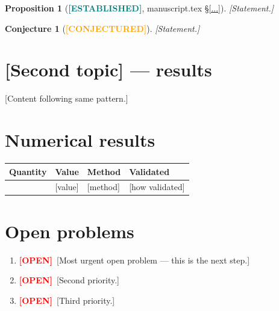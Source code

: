 \documentclass[11pt, a4paper]{article}
\newcommand{\established}{\textcolor{teal}{\textbf{[ESTABLISHED]}}}
\newcommand{\conjectured}{\textcolor{orange}{\textbf{[CONJECTURED]}}}
\newcommand{\open}{\textcolor{red}{\textbf{[OPEN]}}}
\theoremstyle{plain}
\newtheorem{proposition}[theorem]{Proposition}
\newtheorem{conjecture}[theorem]{Conjecture}
\theoremstyle{definition}
\begin{document}
\begin{proposition}[\established, manuscript.tex \S\ref{...}]
[Statement.]
\end{proposition}

\begin{conjecture}[\conjectured]
[Statement.]
\end{conjecture}

\section{[Second topic] — results}
\label{sec:topic2results}

[Content following same pattern.]

\section{Numerical results}
\label{sec:numericresults}


\begin{center}
\begin{tabular}{llll}
\toprule
Quantity & Value & Method & Validated \\
\midrule
[quantity] & [value] & [method] & [how validated] \\
\bottomrule
\end{tabular}
\end{center}

\section{Open problems}
\label{sec:open}


\begin{enumerate}[label=\textbf{O\arabic*.}]
  \item \open\ [Most urgent open problem — this is the next step.]
  \item \open\ [Second priority.]
  \item \open\ [Third priority.]
\end{enumerate}
\end{document}
